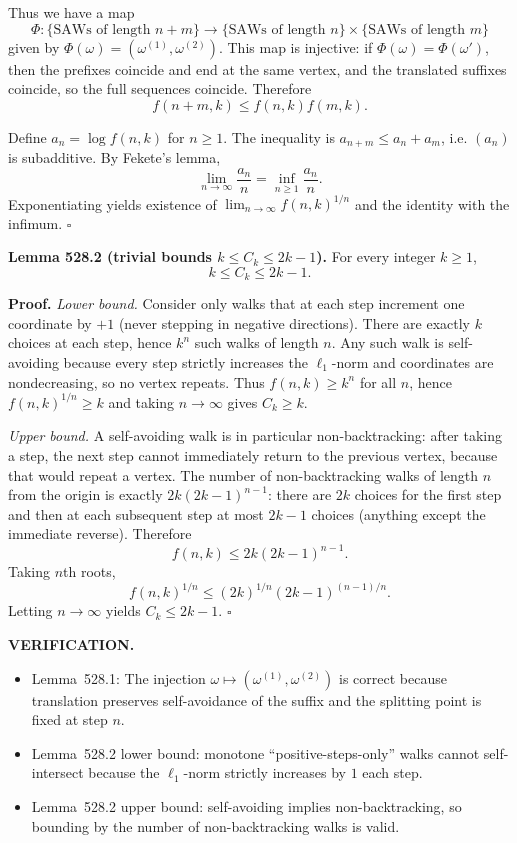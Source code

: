 Thus we have a map
\[\Phi: \{\text{SAWs of length }n+m\} \to \{\text{SAWs of length }n\}\times\{\text{SAWs of length }m\}
\]
given by $\Phi(\omega)=(\omega^{(1)},\omega^{(2)})$.
This map is injective: if $\Phi(\omega)=\Phi(\omega')$, then the prefixes coincide and end at the same vertex, and the translated suffixes coincide, so the full sequences coincide.
Therefore
\[f(n+m,k)\le f(n,k)f(m,k).
\]

Define $a_n=\log f(n,k)$ for $n\ge 1$. The inequality is $a_{n+m}\le a_n+a_m$, i.e. $(a_n)$ is subadditive.
By Fekete's lemma,
\[\lim_{n\to\infty}\frac{a_n}{n} = \inf_{n\ge 1}\frac{a_n}{n}.
\]
Exponentiating yields existence of $\lim_{n\to\infty} f(n,k)^{1/n}$ and the identity with the infimum.
\hfill$\square$

\medskip
\noindent\textbf{Lemma 528.2 (trivial bounds $k\le C_k\le 2k-1$).}
For every integer $k\ge 1$,
\[k\le C_k\le 2k-1.
\]

\noindent\textbf{Proof.}
\emph{Lower bound.}
Consider only walks that at each step increment one coordinate by $+1$ (never stepping in negative directions). There are exactly $k$ choices at each step, hence $k^n$ such walks of length $n$. Any such walk is self-avoiding because every step strictly increases the $\ell_1$-norm and coordinates are nondecreasing, so no vertex repeats.
Thus $f(n,k)\ge k^n$ for all $n$, hence $f(n,k)^{1/n}\ge k$ and taking $n\to\infty$ gives $C_k\ge k$.

\emph{Upper bound.}
A self-avoiding walk is in particular non-backtracking: after taking a step, the next step cannot immediately return to the previous vertex, because that would repeat a vertex.
The number of non-backtracking walks of length $n$ from the origin is exactly $2k(2k-1)^{n-1}$: there are $2k$ choices for the first step and then at each subsequent step at most $2k-1$ choices (anything except the immediate reverse).
Therefore
\[f(n,k)\le 2k(2k-1)^{n-1}.
\]
Taking $n$th roots,
\[f(n,k)^{1/n}\le (2k)^{1/n}(2k-1)^{(n-1)/n}.
\]
Letting $n\to\infty$ yields $C_k\le 2k-1$.
\hfill$\square$

\bigskip
\noindent\textbf{VERIFICATION.}
\begin{itemize}
\item Lemma~528.1: The injection $\omega\mapsto(\omega^{(1)},\omega^{(2)})$ is correct because translation preserves self-avoidance of the suffix and the splitting point is fixed at step $n$.
\item Lemma~528.2 lower bound: monotone ``positive-steps-only'' walks cannot self-intersect because the $\ell_1$-norm strictly increases by $1$ each step.
\item Lemma~528.2 upper bound: self-avoiding implies non-backtracking, so bounding by the number of non-backtracking walks is valid.
\end{itemize}

